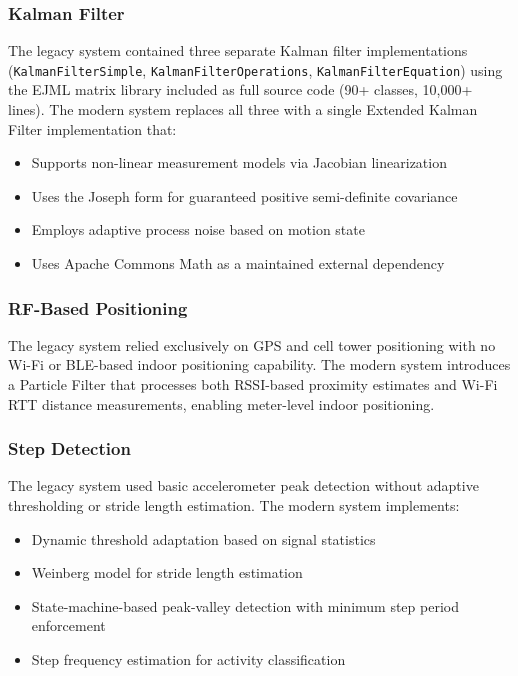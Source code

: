 \documentclass[journal,twocolumn]{IEEEtran}
\begin{document}
\subsubsection{Kalman Filter}
The legacy system contained three separate Kalman filter implementations (\texttt{KalmanFilterSimple}, \texttt{KalmanFilterOperations}, \texttt{KalmanFilterEquation}) using the EJML matrix library included as full source code (90+ classes, 10,000+ lines). The modern system replaces all three with a single Extended Kalman Filter implementation that:
\begin{itemize}
    \item Supports non-linear measurement models via Jacobian linearization
    \item Uses the Joseph form for guaranteed positive semi-definite covariance
    \item Employs adaptive process noise based on motion state
    \item Uses Apache Commons Math as a maintained external dependency
\end{itemize}

\subsubsection{RF-Based Positioning}
The legacy system relied exclusively on GPS and cell tower positioning with no Wi-Fi or BLE-based indoor positioning capability. The modern system introduces a Particle Filter that processes both RSSI-based proximity estimates and Wi-Fi RTT distance measurements, enabling meter-level indoor positioning.

\subsubsection{Step Detection}
The legacy system used basic accelerometer peak detection without adaptive thresholding or stride length estimation. The modern system implements:
\begin{itemize}
    \item Dynamic threshold adaptation based on signal statistics
    \item Weinberg model for stride length estimation
    \item State-machine-based peak-valley detection with minimum step period enforcement
    \item Step frequency estimation for activity classification
\end{itemize}
\end{document}
